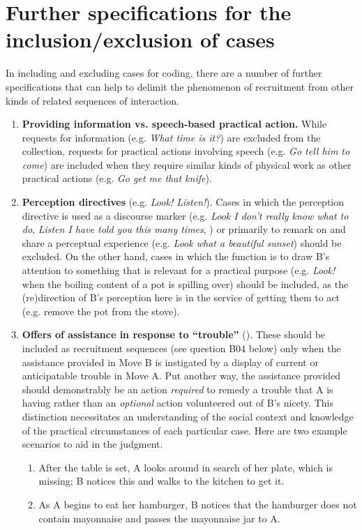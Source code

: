 \documentclass[output=paper]{langsci/langscibook}
\begin{document}
\section{Further specifications for the inclusion/exclusion of cases}\label{sec:coding:3}

In including and excluding cases for coding, there are a number of further specifications that can help to delimit the phenomenon of recruitment from other kinds of related sequences of interaction.

\begin{enumerate}
\item \textbf{Providing information vs. speech-based practical action.} While requests for information (e.g. \textit{What time is it?}) are {excluded} from the collection, requests for practical actions involving speech (e.g. \textit{Go tell him to come}) are {included} when they require similar kinds of physical work as other practical actions (e.g. \textit{Go get me that knife}).

\item \textbf{Perception directives} (e.g. \textit{Look! Listen!}). Cases in which the perception directive is used as a discourse marker (e.g. \textit{Look I don’t really know what to do}, \textit{Listen I have told you this many times}, \citealt{sidnell_look-prefaced_2007}) or primarily to remark on and share a perceptual experience (e.g. \textit{Look what a beautiful sunset}) should be excluded. On the other hand, cases in which the function is to draw B’s attention to something that is relevant for a practical purpose (e.g. \textit{Look!} when the boiling content of a pot is spilling over) should be included, as the (re)direction of B’s perception here is in the service of getting them to act (e.g. remove the pot from the stove).

\item \label{par:coding:offers} \textbf{Offers of assistance in response to “trouble”} (\citealt{Curl2006}). These should be included as recruitment sequences (see question B04 below) only when the assistance provided in Move B is instigated by a display of current or anticipatable trouble in Move A. Put another way, the assistance provided should demonstrably be an action \textit{required} to remedy a trouble that A is having rather than an \textit{optional} action volunteered out of B’s nicety. This distinction necessitates an understanding of the social context and knowledge of the practical circumstances of each particular case. Here are two example scenarios to aid in the judgment.
\renewcommand{\theenumii}{\roman{enumii}}
\begin{enumerate}
\item After the table is set, A looks around in search of her plate, which is missing; B notices this and walks to the kitchen to get it.
\item As A begins to eat her hamburger, B notices that the hamburger does not contain mayonnaise and passes the mayonnaise jar to A.
\end{enumerate}


\end{enumerate}
\end{document}
